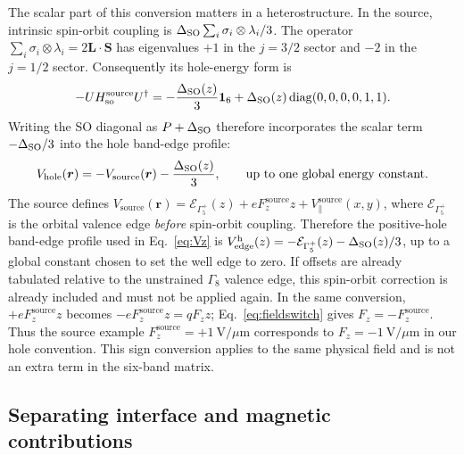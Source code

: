 The scalar part of this conversion matters in a heterostructure. In the source, intrinsic spin-orbit coupling is $\Delta_{\mathrm{SO}}\sum_i\sigma_i\otimes\lambda_i/3$. The operator $\sum_i\sigma_i\otimes\lambda_i=2\bm L\cdot\bm S$ has eigenvalues $+1$ in the $j=3/2$ sector and $-2$ in the $j=1/2$ sector. Consequently its hole-energy form is
\begin{equation}
-U H_{\mathrm{so}}^{\mathrm{source}}U^\dagger
=-\frac{\Delta_{\mathrm{SO}}(z)}{3}\mathbf 1_6
+\Delta_{\mathrm{SO}}(z)\operatorname{diag}(0,0,0,0,1,1).
\label{eq:SOreference}
\end{equation}
Writing the SO diagonal as $P+\Delta_{\mathrm{SO}}$ therefore incorporates the scalar term $-\Delta_{\mathrm{SO}}/3$ into the hole band-edge profile:
\begin{equation}
V_{\mathrm{hole}}(\bm r)
=-V_{\mathrm{source}}(\bm r)-\frac{\Delta_{\mathrm{SO}}(z)}{3},
\qquad\text{up to one global energy constant}.
\label{eq:Vconversion}
\end{equation}
The source defines $V_{\mathrm{source}}(\bm r)=\mathcal E_{\Gamma_5^+}(z)+eF_z^{\mathrm{source}}z+V_{\parallel}^{\mathrm{source}}(x,y)$, where $\mathcal E_{\Gamma_5^+}$ is the orbital valence edge \emph{before} spin-orbit coupling. Therefore the positive-hole band-edge profile used in Eq.~\eqref{eq:Vz} is $V_{\mathrm{edge}}^{\mathrm h}(z)=-\mathcal E_{\Gamma_5^+}(z)-\Delta_{\mathrm{SO}}(z)/3$, up to a global constant chosen to set the well edge to zero. If offsets are already tabulated relative to the unstrained $\Gamma_8$ valence edge, this spin-orbit correction is already included and must not be applied again. In the same conversion, $+eF_z^{\mathrm{source}}z$ becomes $-eF_z^{\mathrm{source}}z=qF_z z$; Eq.~\eqref{eq:fieldswitch} gives $F_z=-F_z^{\mathrm{source}}$. Thus the source example $F_z^{\mathrm{source}}=+1~\mathrm{V}/\mu\mathrm m$ corresponds to $F_z=-1~\mathrm{V}/\mu\mathrm m$ in our hole convention. This sign conversion applies to the same physical field and is not an extra term in the six-band matrix.

\subsection{Separating interface and magnetic contributions}

